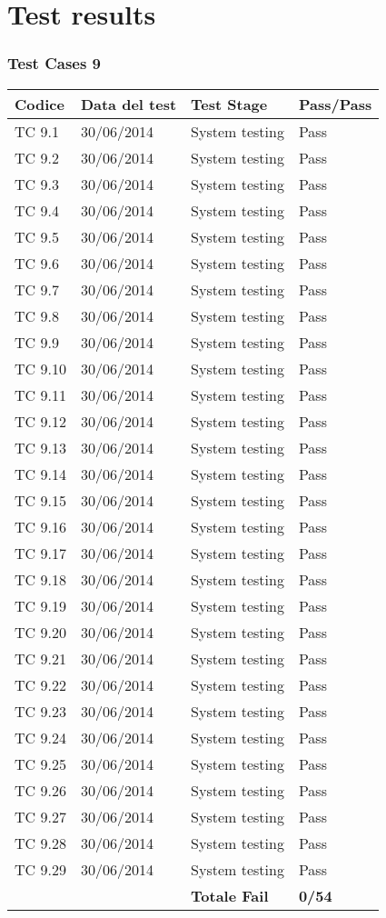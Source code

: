 \chapter{Test results}

\subsection{Test Cases 9}

\begin{longtable}{|p{3cm}|p{3cm}|p{3cm}|p{3cm}|}
	\hline
	\rowcolor{Gray}
	\textbf{Codice} & \textbf{Data del test} & \textbf{Test Stage} & \textbf{Pass/Pass}\tabularnewline
	\hline
	TC 9.1			& 30/06/2014 			& System testing		& Pass \tabularnewline
	\hline
	TC 9.2			& 30/06/2014 			& System testing		& Pass \tabularnewline
	\hline
	TC 9.3			& 30/06/2014 			& System testing		& Pass \tabularnewline
	\hline
	TC 9.4			& 30/06/2014 			& System testing		& Pass \tabularnewline
	\hline
	TC 9.5			& 30/06/2014 			& System testing		& Pass \tabularnewline
	\hline
	TC 9.6			& 30/06/2014 			& System testing		& Pass \tabularnewline
	\hline
	TC 9.7			& 30/06/2014 			& System testing		& Pass \tabularnewline
	\hline
	TC 9.8			& 30/06/2014 			& System testing		& Pass \tabularnewline
	\hline
	TC 9.9			& 30/06/2014 			& System testing		& Pass \tabularnewline
	\hline
	TC 9.10			& 30/06/2014 			& System testing		& Pass \tabularnewline
	\hline
	TC 9.11			& 30/06/2014 			& System testing		& Pass \tabularnewline
	\hline
	TC 9.12			& 30/06/2014 			& System testing		& Pass \tabularnewline
	\hline
	TC 9.13			& 30/06/2014 			& System testing		& Pass \tabularnewline
	\hline
	TC 9.14			& 30/06/2014 			& System testing		& Pass \tabularnewline
	\hline
	TC 9.15			& 30/06/2014 			& System testing		& Pass \tabularnewline
	\hline
	TC 9.16			& 30/06/2014 			& System testing		& Pass \tabularnewline
	\hline
	TC 9.17			& 30/06/2014 			& System testing		& Pass \tabularnewline
	\hline
	TC 9.18			& 30/06/2014 			& System testing		& Pass \tabularnewline
	\hline
	TC 9.19			& 30/06/2014 			& System testing		& Pass \tabularnewline
	\hline
	TC 9.20			& 30/06/2014 			& System testing		& Pass \tabularnewline
	\hline
	TC 9.21			& 30/06/2014 			& System testing		& Pass \tabularnewline
	\hline
	TC 9.22			& 30/06/2014 			& System testing		& Pass \tabularnewline
	\hline
	TC 9.23			& 30/06/2014 			& System testing		& Pass \tabularnewline
	\hline
	TC 9.24			& 30/06/2014 			& System testing		& Pass \tabularnewline
	\hline
	TC 9.25			& 30/06/2014 			& System testing		& Pass \tabularnewline
	\hline
	TC 9.26			& 30/06/2014 			& System testing		& Pass \tabularnewline
	\hline
	TC 9.27			& 30/06/2014 			& System testing		& Pass \tabularnewline
	\hline
	TC 9.28			& 30/06/2014 			& System testing		& Pass \tabularnewline
	\hline
	TC 9.29			& 30/06/2014 			& System testing		& Pass \tabularnewline
	\hline
					& 						& \textbf{Totale Fail}	& \textbf{0/54} \tabularnewline
	\hline
\end{longtable}